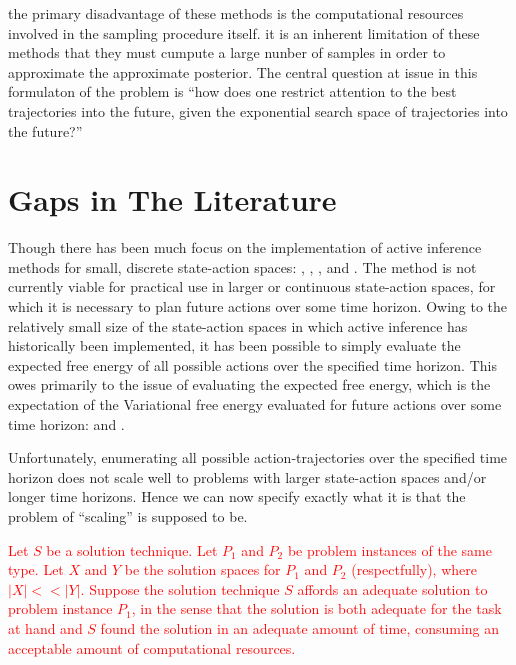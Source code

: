 \documentclass[onecolumn]{IEEEtran}
\begin{document}
the primary disadvantage of these methods is the computational resources involved in the sampling procedure itself. it is an inherent limitation of these methods that they must cumpute a large nunber of samples in order to approximate the approximate posterior. The central question at issue in this formulaton of the problem is ``how does one restrict attention to the best trajectories into the future, given the exponential search space of trajectories into the future?''

\section{Gaps in The Literature}
Though there has been much focus on the implementation of active inference methods for small, discrete state-action spaces: \textcite{Applications-of-FEP-Machine-Learning-Neuroscience}, \textcite{AIF-Discrete-Action-Spaces-Synthesis}, \textcite{Step-by-Step-Tutorial-AIF-Empirical-Data}, \textcite{Relationship-Dynamic-Programming-AIF} and \textcite{AIF-Epistemic-Value}. The method is not currently viable for practical use in larger or continuous state-action spaces, for which it is necessary to plan future actions over some time horizon. Owing to the relatively small size of the state-action spaces in which active inference has historically been implemented, it has been possible to simply evaluate the expected free energy of all possible actions over the specified time horizon. This owes primarily to the issue of evaluating the expected free energy, which is the expectation of the Variational free energy evaluated for future actions over some time horizon: \textcite{Message-Passing-Perspective-Planning-Under-AIF} and \textcite{Bayesian-Policy-Selection-Using-AIF}. 

Unfortunately, enumerating all possible action-trajectories over the specified time horizon does not scale well to problems with larger state-action spaces
and/or longer time horizons. Hence we can now specify exactly what it is that the problem of ``scaling'' is supposed to be. 

\textcolor{red}{Let $S$ be a solution technique. Let $P_1$ and $P_2$ be problem instances of the same type. Let $X$ and $Y$ be the solution spaces for $P_1$ and $P_2$ (respectfully), where $|X| << |Y|$. Suppose the solution technique $S$ affords an adequate solution to problem instance $P_1$, in the sense that the solution is both adequate for the task at hand and $S$ found the solution in an adequate amount of time, consuming an acceptable amount of computational resources.}
\end{document}
